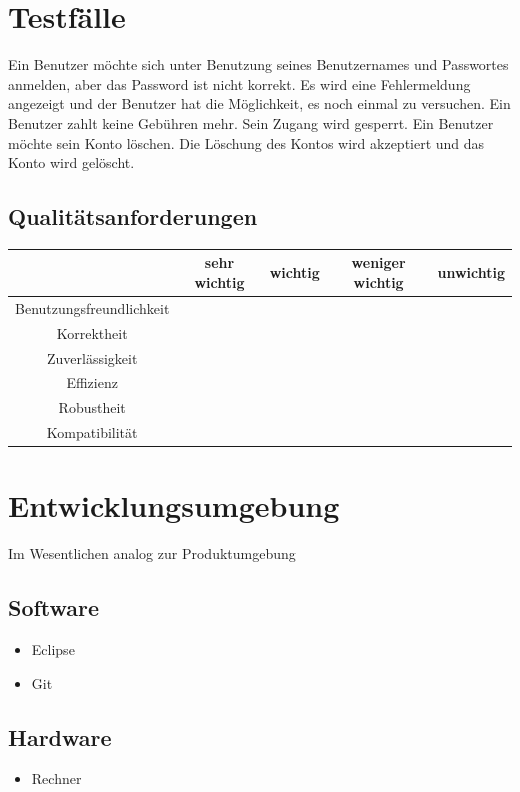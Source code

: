 \documentclass[a4paper,10pt]{scrartcl}
\begin{document}
\section{Testfälle}

\begin{usecase}
 {Ein Benutzer möchte sich unter Benutzung seines Benutzernames und
                Passwortes anmelden, aber das Password ist nicht korrekt. Es wird eine
                Fehlermeldung angezeigt und der Benutzer hat die Möglichkeit, es noch
                einmal zu versuchen.}
 {Ein Benutzer zahlt keine Gebühren mehr. Sein Zugang wird gesperrt.}
 {Ein Benutzer möchte sein Konto löschen. Die Löschung des Kontos wird 
                akzeptiert und das Konto wird gelöscht.}
\end{usecase}

\subsection{Qualitätsanforderungen}

\begin{tabular}{|c|c|c|c|c|}
\hline
 & \sffamily \textbf{sehr wichtig}
 & \sffamily \textbf{wichtig}
 & \sffamily \textbf{weniger wichtig}
 & \sffamily \textbf{unwichtig} \\
\hline
Benutzungsfreundlichkeit &  &  \X & & \\
\hline
Korrektheit &  \X & & &  \\
\hline
Zuverlässigkeit &  \X & & & \\
\hline
Effizienz &   \X & & & \\
\hline
Robustheit &  & & &\\
\hline
Kompatibilität &  & & & \\
\hline
\end{tabular}

\section{Entwicklungsumgebung}
Im Wesentlichen analog zur Produktumgebung

\subsection{Software}
\begin{itemize}
\item Eclipse
\item Git
\end{itemize}
\subsection{Hardware}
\begin{itemize}
\item Rechner
\end{itemize}


\clearpage


{}

\end{document}
